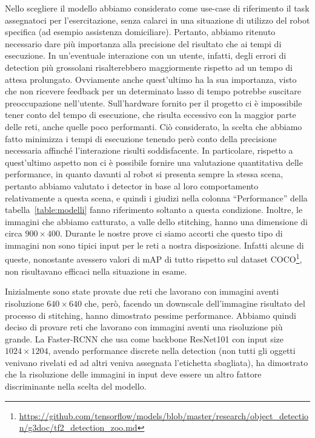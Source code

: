 Nello scegliere il modello abbiamo considerato come use-case di riferimento il task assegnatoci per l'esercitazione, senza calarci in una situazione di utilizzo del robot specifica (ad esempio assistenza domiciliare). Pertanto, abbiamo ritenuto necessario dare più importanza alla precisione del risultato che ai tempi di esecuzione. In un'eventuale interazione con un utente, infatti, degli errori di detection più grossolani risalterebbero maggiormente rispetto ad un tempo di attesa prolungato. Ovviamente anche quest'ultimo ha la sua importanza, visto che non ricevere feedback per un determinato lasso di tempo potrebbe suscitare preoccupazione nell'utente. Sull'hardware fornito per il progetto ci è impossibile tener conto del tempo di esecuzione, che risulta eccessivo con la maggior parte delle reti, anche quelle poco performanti. Ciò considerato, la scelta che abbiamo fatto minimizza i tempi di esecuzione tenendo però conto della precisione necessaria affinché l'interazione risulti soddisfacente.
In particolare, rispetto a quest’ultimo aspetto non ci è possibile fornire una valutazione quantitativa delle performance, in quanto davanti al robot si presenta sempre la stessa scena, pertanto abbiamo valutato i detector in base al loro comportamento relativamente a questa scena, e quindi i giudizi nella colonna “Performance” della tabella~\ref{table:modelli} fanno riferimento soltanto a questa condizione. Inoltre, le immagini che abbiamo catturato, a valle dello stitching, hanno una dimensione di circa $900 \times 400$. Durante le nostre prove ci siamo accorti che questo tipo di immagini non sono tipici input per le reti a nostra disposizione. Infatti alcune di queste, nonostante avessero valori di mAP di tutto rispetto sul dataset COCO\footnote{\url{https://github.com/tensorflow/models/blob/master/research/object_detection/g3doc/tf2_detection_zoo.md}}, non risultavano efficaci nella situazione in esame.

Inizialmente sono state provate due reti che lavorano con immagini aventi risoluzione $640 \times 640$ che, però, facendo un downscale dell’immagine risultato del processo di stitching, hanno dimostrato pessime performance.
Abbiamo quindi deciso di provare reti che lavorano con immagini aventi una risoluzione più grande. La Faster-RCNN che usa come backbone ResNet101 con input size $1024 \times 1204$, avendo performance discrete nella detection (non tutti gli oggetti venivano rivelati ed ad altri veniva assegnata l’etichetta sbagliata), ha dimostrato che la risoluzione delle immagini in input deve essere un altro fattore discriminante nella scelta del modello.

